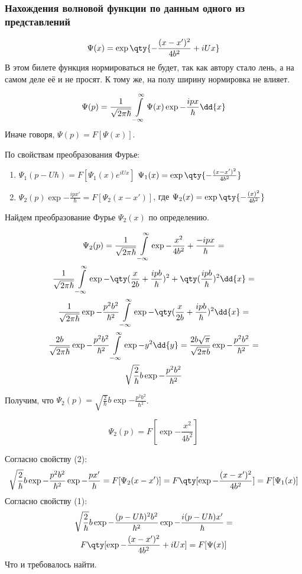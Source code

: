 \subsubsection{Нахождения волновой функции по данным одного из представлений}

$$\Psi(x)=\exp \qty{-\frac{(x-x')^2}{4b^2}+iUx} $$
В этом билете функция нормироваться не будет, так как автору стало лень, а на самом деле её и не просят. К тому же, на полу ширину нормировка не влияет.

$$\Psi(p)=\frac{1}{\sqrt{2\pi\hbar} } \infint \Psi(x) \exp{-\frac{ipx}{\hbar}}\dd{x} $$
Иначе говоря, $\Psi(p)=F[\Psi(x)]$.

По свойствам преобразования Фурье:  
\begin{enumerate}
	\item $\Psi_1(p-U\hbar)= F[\Psi_1(x)e^{iUx}]$ $\Psi_1(x)=\exp \qty{-\frac{(x-x')^2}{4b^2}}$
	\item $\Psi_2(p)\exp{-\frac{ipx'}{\hbar}}=F[\Psi_2(x-x')]$, где 
	$\Psi_2(x)=\exp \qty{-\frac{(x)^2}{4b^2}}$
\end{enumerate}

Найдем преобразование Фурье $\Psi_2(x)$ по определению.

\begin{gather*}
\Psi_2(p)=\frac{1}{\sqrt{2\pi\hbar}}\infint \exp{-\frac{x^2}{4b^2}+\frac{-ipx}{\hbar}}=\\
\frac{1}{\sqrt{2\pi\hbar}}\infint \exp{-\qty(\frac{x}{2b}+\frac{ipb}{\hbar})^2+
\qty(\frac{ipb}{\hbar})^2}\dd{x}= \\
\frac{1}{\sqrt{2\pi\hbar}}\exp{-\frac{p^2b^2}{\hbar^2}} 
\infint \exp{-\qty(\frac{x}{2b}+\frac{ipb}{\hbar})^2} \dd{x}=\\
\frac{2b}{\sqrt{2\pi\hbar}}\exp{-\frac{p^2b^2}{\hbar^2}} 
\infint \exp{-y^2}\dd{y}=\frac{2b\sqrt\pi}{\sqrt{2\pi b}}\exp{-\frac{p^2b^2}{\hbar^2}}=\\ 
\sqrt{\frac{2}{\hbar}}b\exp{-\frac{p^2b^2}{\hbar^2}}
\end{gather*}

Получим, что $\Psi_2(p)=\sqrt{\frac{2}{\hbar}}b\exp{-\frac{p^2b^2}{\hbar^2}}$.

$$\Psi_2(p)=F[\exp{-\frac{x^2}{4b^2}}]$$

Согласно свойству (2):
$$\sqrt{\frac{2}{\hbar}}b\exp{-\frac{p^2b^2}{\hbar^2}}\exp{-\frac{px'}{\hbar}}=
F[\Psi_2(x-x')]=F\qty[ \exp{-\frac{(x-x')^2}{4b^2}} ] = F[\Psi_1(x)]$$
Согласно свойству (1):
\begin{gather*}
\sqrt{\frac{2}{\hbar}}b\exp{-\frac{(p-U\hbar)^2b^2}{\hbar^2}}\exp{-\frac{i(p-U\hbar)x'}{\hbar}}=\\
 F\qty[\exp{-\frac{(x-x')^2}{4b^2}}+iUx]=F[\Psi(x)]
\end{gather*}
Что и требовалось найти.

